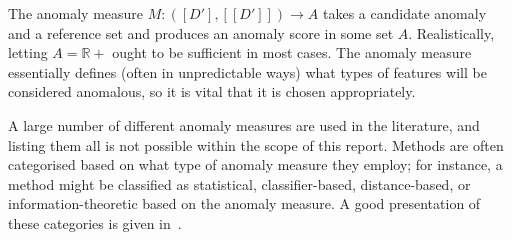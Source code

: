 The anomaly measure $M: ([D'], [[D']]) \rightarrow A$ takes a candidate anomaly and a reference set and produces an anomaly score in some set $A$. Realistically, letting $A = \mathbb{R}+$ ought to be sufficient in most cases. The anomaly measure essentially defines (often in unpredictable ways) what types of features will be considered anomalous, so it is vital that it is chosen appropriately.

A large number of different anomaly measures are used in the literature, and listing them all is not possible within the scope of this report. Methods are often categorised based on what type of anomaly measure they employ; for instance, a method might be classified as statistical, classifier-based, distance-based, or information-theoretic based on the anomaly measure. A good presentation of these categories is given in~\cite{chandola}.

